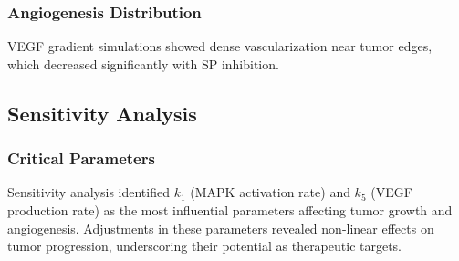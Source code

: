 \documentclass{article}
\theoremstyle{plain}
\theoremstyle{definition}
\begin{document}
\subsubsection{Angiogenesis Distribution}
VEGF gradient simulations showed dense vascularization near tumor edges, which decreased significantly with SP inhibition.

\subsection{Sensitivity Analysis}

\subsubsection{Critical Parameters}
Sensitivity analysis identified \( k_1 \) (MAPK activation rate) and \( k_5 \) (VEGF production rate) as the most influential parameters affecting tumor growth and angiogenesis. Adjustments in these parameters revealed non-linear effects on tumor progression, underscoring their potential as therapeutic targets.
\end{document}
